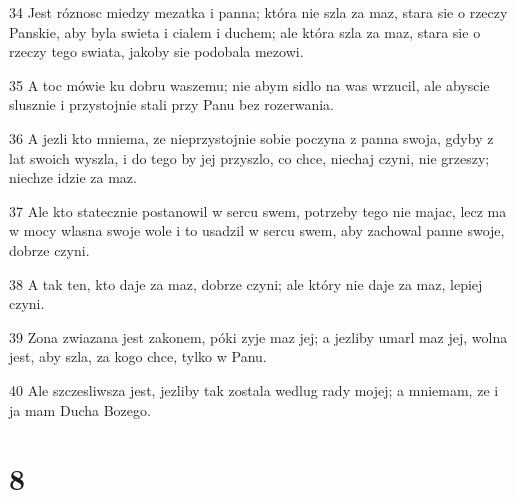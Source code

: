 \par 34 Jest róznosc miedzy mezatka i panna; która nie szla za maz, stara sie o rzeczy Panskie, aby byla swieta i cialem i duchem; ale która szla za maz, stara sie o rzeczy tego swiata, jakoby sie podobala mezowi.
\par 35 A toc mówie ku dobru waszemu; nie abym sidlo na was wrzucil, ale abyscie slusznie i przystojnie stali przy Panu bez rozerwania.
\par 36 A jezli kto mniema, ze nieprzystojnie sobie poczyna z panna swoja, gdyby z lat swoich wyszla, i do tego by jej przyszlo, co chce, niechaj czyni, nie grzeszy; niechze idzie za maz.
\par 37 Ale kto statecznie postanowil w sercu swem, potrzeby tego nie majac, lecz ma w mocy wlasna swoje wole i to usadzil w sercu swem, aby zachowal panne swoje, dobrze czyni.
\par 38 A tak ten, kto daje za maz, dobrze czyni; ale który nie daje za maz, lepiej czyni.
\par 39 Zona zwiazana jest zakonem, póki zyje maz jej; a jezliby umarl maz jej, wolna jest, aby szla, za kogo chce, tylko w Panu.
\par 40 Ale szczesliwsza jest, jezliby tak zostala wedlug rady mojej; a mniemam, ze i ja mam Ducha Bozego.

\chapter{8}

